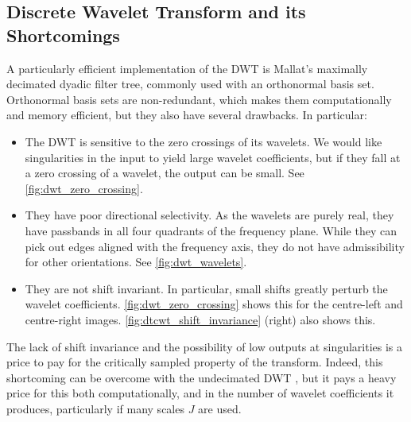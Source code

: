 \subsection{Discrete Wavelet Transform and its Shortcomings}\label{sec:dwt_problems}
  A particularly efficient implementation of the 
  DWT is Mallat's maximally decimated dyadic filter tree, commonly used with
  an orthonormal basis set.  Orthonormal basis sets are non-redundant, which
  makes them computationally and memory efficient, but they also have several
  drawbacks. In particular:

  \begin{itemize}
    \item The DWT is sensitive to the zero crossings of its wavelets. We would
      like singularities in the input to yield large wavelet coefficients, but
      if they fall at a zero crossing of a wavelet, the output can be small. See
      \autoref{fig:dwt_zero_crossing}.
    \item They have poor directional selectivity. As the wavelets are purely
      real, they have passbands in all four quadrants of the frequency plane.
      While they can pick out edges aligned with the frequency axis, they do
      not have admissibility for other orientations. See
      \autoref{fig:dwt_wavelets}.
    \item They are not shift invariant. In particular, small shifts greatly
      perturb the wavelet coefficients. \autoref{fig:dwt_zero_crossing} shows
      this for the centre-left and centre-right images.
      \autoref{fig:dtcwt_shift_invariance} (right) also shows this.
  \end{itemize}

  The lack of shift invariance and the possibility of low outputs at
  singularities is a price to pay for the critically sampled property of the
  transform. Indeed, this shortcoming can be overcome with the undecimated DWT
  \citep{mallat_wavelet_1998,coifman_translation-invariant_1995}, 
  but it pays a heavy price for this both
  computationally, and in the number of wavelet coefficients it produces,
  particularly if many scales $J$ are used. 

